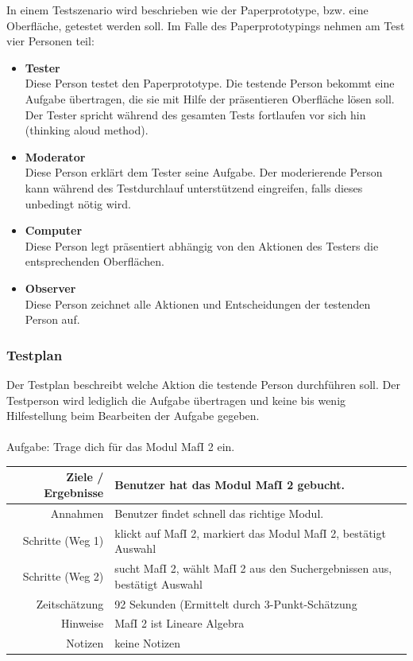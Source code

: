 \documentclass{article}
\begin{document}
In einem Testszenario wird beschrieben wie der Paperprototype, bzw. eine Oberfläche, getestet werden soll. Im Falle des Paperprototypings nehmen am Test vier Personen teil:
\begin{itemize}
\item \textbf{Tester}\\
Diese Person testet den Paperprototype. Die testende Person bekommt eine Aufgabe übertragen, die sie mit Hilfe der präsentieren Oberfläche lösen soll. Der Tester spricht während des gesamten Tests fortlaufen vor sich hin (thinking aloud method).
\item \textbf{Moderator}\\
Diese Person erklärt dem Tester seine Aufgabe. Der moderierende Person kann während des Testdurchlauf unterstützend eingreifen, falls dieses unbedingt nötig wird.
\item \textbf{Computer}\\
Diese Person legt präsentiert abhängig von den Aktionen des Testers die entsprechenden Oberflächen.
\item \textbf{Observer}\\
Diese Person zeichnet alle Aktionen und Entscheidungen der testenden Person auf.
\end{itemize}

\subsubsection{Testplan}

Der Testplan beschreibt welche Aktion die testende Person durchführen soll. Der Testperson wird lediglich die Aufgabe übertragen und keine bis wenig Hilfestellung beim Bearbeiten der Aufgabe gegeben.\\
\\
Aufgabe: Trage dich für das Modul MafI 2 ein.\\
\begin{tabular}{|r|l|}
\hline
Ziele / Ergebnisse & Benutzer hat das Modul MafI 2 gebucht.\\
\hline
Annahmen & Benutzer findet schnell das richtige Modul.\\
\hline
Schritte (Weg 1) & klickt auf MafI 2, markiert das Modul MafI 2, bestätigt Auswahl\\
Schritte (Weg 2) & sucht MafI 2, wählt MafI 2 aus den Suchergebnissen aus, bestätigt Auswahl\\
\hline
Zeitschätzung & 92 Sekunden (Ermittelt durch 3-Punkt-Schätzung\\
\hline
Hinweise & MafI 2 ist Lineare Algebra\\
\hline
Notizen & keine Notizen\\
\hline
\end{tabular}
\newpage
\end{document}
